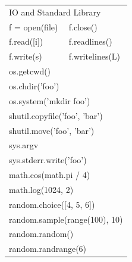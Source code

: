 \documentclass{article}
\begin{document}
\begin{minipage}{0.9\textwidth}
\begin{multicols}{3}
\begin{tabular}{ll}
\multicolumn{2}{l}{\sffamily \color{pythonblue} IO and Standard Library} \\
f = open(file) & f.close()                                            \\
f.read([i])    & f.readlines()                                        \\
f.write(s)     & f.writelines(L)                                      \\
\multicolumn{2}{l}{os.getcwd()}                                       \\
\multicolumn{2}{l}{os.chdir('foo')}                                   \\
\multicolumn{2}{l}{os.system('mkdir foo')}                            \\
\multicolumn{2}{l}{shutil.copyfile('foo', 'bar')}                     \\
\multicolumn{2}{l}{shutil.move('foo', 'bar')}                         \\
\multicolumn{2}{l}{sys.argv}                                          \\
\multicolumn{2}{l}{sys.stderr.write('foo')}                           \\
\multicolumn{2}{l}{math.cos(math.pi / 4)}                             \\
\multicolumn{2}{l}{math.log(1024, 2)}                                 \\
\multicolumn{2}{l}{random.choice([4, 5, 6])}                          \\
\multicolumn{2}{l}{random.sample(range(100), 10)}                     \\
\multicolumn{2}{l}{random.random()}                                   \\
\multicolumn{2}{l}{random.randrange(6)}                               \\
\end{tabular}

\end{multicols}
\end{minipage}
\quad
\vline
\quad
\begin{minipage}{0.1\textwidth}
\LARGE
{}
\end{minipage}
\end{document}
